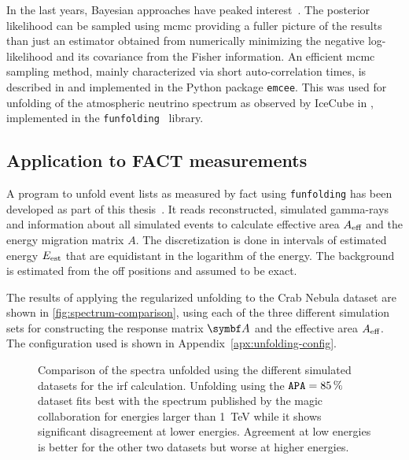 In the last years, Bayesian approaches have peaked interest~\cite[Section~2]{benning-burger}.
The posterior likelihood can be sampled using \gls{mcmc} providing a 
fuller picture of the results than just an estimator obtained from numerically minimizing
the negative log-likelihood and its covariance from the Fisher information.
An efficient \gls{mcmc} sampling method, mainly characterized via short auto-correlation times,
is described in \cite{emcee-algo} and implemented in the Python package \texttt{emcee}.
This was used for unfolding of the atmospheric neutrino spectrum as observed by IceCube in 
\cite{phd-boerner}, implemented in the \texttt{funfolding}~\cite{funfolding} library.

\subsection{Application to FACT measurements}
A program to unfold event lists as measured by \gls{fact} using \texttt{funfolding} has been developed as part of this thesis~\cite{fact-funfolding}.
It reads reconstructed, simulated gamma-rays and information about
all simulated events to calculate effective area $\Aeff$ and the energy migration matrix $A$.
The discretization is done in intervals of estimated energy $\Eest$ that are equidistant in
the logarithm of the energy.
The background is estimated from the off positions and assumed to be exact.

The results of applying the regularized unfolding to the Crab Nebula dataset 
are shown in \autoref{fig:spectrum-comparison}, using each of the
three different simulation sets for constructing the response matrix $\v{A}$ and
the effective area $\Aeff$.
The configuration used is shown in Appendix~\ref{apx:unfolding-config}.

\begin{figure}
  \centering
  
  \caption{%
    Comparison of the spectra unfolded using the different simulated datasets
    for the \gls{irf} calculation.
    Unfolding using the $\mathtt{APA} = \SI{85}{\percent}$ dataset fits best
    with the spectrum published by the \gls{magic} collaboration for energies
    larger than \SI{1}{\TeV} while it shows significant disagreement at lower energies.
    Agreement at low energies is better for the other two datasets but worse at 
    higher energies.
  }\label{fig:spectrum-comparison}
\end{figure}

